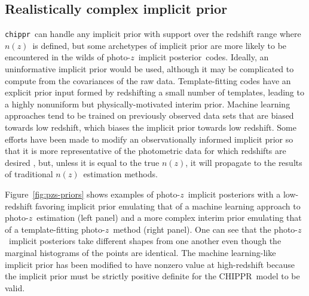 \documentclass[iop]{emulateapj}
\newcommand{\Fig}[1]{Figure~\ref{#1}}
\newcommand{\project}[1]{\textsc{#1}}
\newcommand{\Chippr}{\project{CHIPPR}}%
\newcommand{\repo}[1]{\texttt{#1}}
\newcommand{\chippr}{\repo{chippr}}
\newcommand{\pz}{photo-$z$}
\newcommand{\pzip}{\pz\ implicit posterior}
\newcommand{\nz}{$n(z)$}
\begin{document}
\subsection{Realistically complex implicit prior}
\label{sec:interim}

\chippr\ can handle any implicit prior with support over the redshift range where \nz\ is defined, but some archetypes of implicit prior are more likely to be encountered in the wilds of \pzip\ codes.
Ideally, an uninformative implicit prior would be used, although it may be complicated to compute from the covariances of the raw data.  
Template-fitting codes have an explicit prior input formed by redshifting a small number of templates, leading to a highly nonuniform but physically-motivated interim prior.
Machine learning approaches tend to be trained on previously observed data sets that are biased towards low redshift, which biases the implicit prior towards low redshift.
Some efforts have been made to modify an observationally informed implicit prior so that it is more representative of the photometric data for which redshifts are desired \citep{sheldon_photometric_2012}, but, unless it is equal to the true \nz, it will propagate to the results of traditional \nz\ estimation methods.  

\Fig{fig:pzs-priors} shows examples of \pzip s with a low-redshift favoring implicit prior emulating that of a machine learning approach to \pz\ estimation (left panel) and a more complex interim prior emulating that of a template-fitting \pz\ method (right panel).
One can see that the \pzip s take different shapes from one another even though the marginal histograms of the points are identical.
The machine learning-like implicit prior has been modified to have nonzero value at high-redshift because the implicit prior must be strictly positive definite for the \Chippr\ model to be valid.
\end{document}
